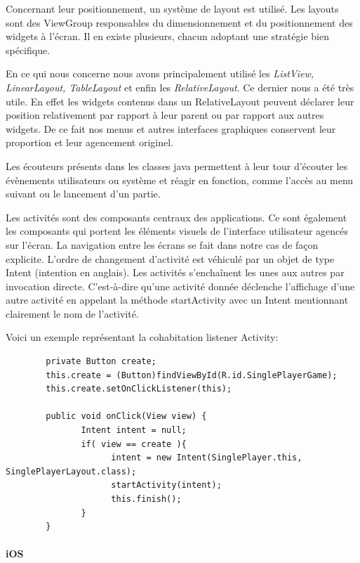 		Concernant leur positionnement, un système de layout est utilisé. Les layouts sont des ViewGroup responsables
		du dimensionnement et du positionnement des widgets à l’écran. Il en existe plusieurs, 
		chacun adoptant une stratégie bien spécifique. 
		
		En ce qui nous concerne nous avons principalement utilisé les
		\textit{ListView, LinearLayout, TableLayout} et enfin les \textit{RelativeLayout}. Ce dernier nous a été très utile. En
		effet les widgets contenus dans un RelativeLayout peuvent déclarer leur position relativement
		par rapport à leur parent ou par rapport aux autres widgets. De ce fait nos
		menus et autres interfaces graphiques conservent leur proportion et leur
		agencement originel.		
		
		
		Les écouteurs présents dans les classes java permettent à leur tour d'écouter les évènements utilisateurs
		ou système et réagir en fonction, comme l'accès au menu suivant ou le lancement
		d'un partie. 
		
		
		Les activités sont des composants centraux des applications. Ce sont également les
		composants qui portent les éléments visuels de l’interface utilisateur agencés
		sur l’écran. La navigation entre les écrans se fait dans notre cas de façon
		explicite. L’ordre de changement d’activité est véhiculé par un objet de type Intent (intention en anglais).
		Les activités s’enchaînent les unes aux autres par invocation directe.
		C’est-à-dire qu’une activité donnée déclenche l’affichage d’une autre activité 
		en appelant la méthode startActivity avec un Intent mentionnant clairement le nom
		de l’activité. 
		
		Voici un exemple représentant la cohabitation listener Activity:
		
		\begin{verbatim}
		private Button create;
		this.create = (Button)findViewById(R.id.SinglePlayerGame);
		this.create.setOnClickListener(this);
			
		public void onClick(View view) {
		       Intent intent = null;
		       if( view == create ){
		             intent = new Intent(SinglePlayer.this, SinglePlayerLayout.class);
		             startActivity(intent);
		             this.finish();
		       }
		}
		\end{verbatim}
		
		
		
		
		
		
	\paragraph{iOS\\}
		
